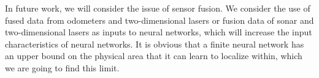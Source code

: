 \documentclass[journal]{IEEEtran}
\begin{document}
In future work, we will consider the issue of sensor fusion. We consider the use of fused data from odometers and two-dimensional lasers or fusion data of sonar and two-dimensional lasers as inputs to neural networks, which will increase the input characteristics of neural networks. It is obvious that a finite neural network has an upper bound on the physical area that it can learn to localize within, which we are going to  find this limit.

\appendices


















\end{document}
